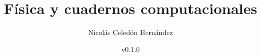 \documentclass[
  12pt,
  oneside,
  openany,
  draft,
  ]{book}
\title{Física y cuadernos computacionales}
\author{Nicolás {Celedón Hernández}}
\date{v0.1.0}
\begin{document}
\frontmatter%

\maketitle%

\begin{titlepage}
  
\end{titlepage}

\tableofcontents%

\setlength{\parindent}{0pt}
\setlength{\parskip}{%
\medskipamount}




\mainmatter%




\appendix




\backmatter%

\printbibliography[heading=bibintoc]%
\end{document}
